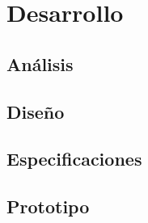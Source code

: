 \chapter{Desarrollo}
\section{Análisis}

\section{Diseño}

\section{Especificaciones}

\section{Prototipo}
